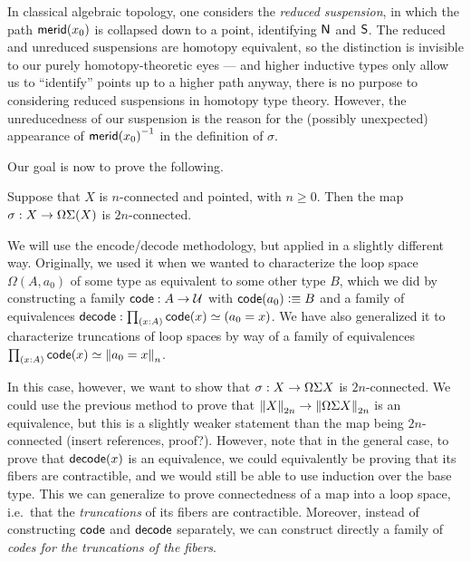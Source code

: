 \begin{rmk}
  In classical algebraic topology, one considers the \emph{reduced suspension}, in which the path $\merid(x_0)$ is collapsed down to a point, identifying $\north$ and $\south$.
  The reduced and unreduced suspensions are homotopy equivalent, so the distinction is invisible to our purely homotopy-theoretic eyes --- and higher inductive types only allow us to ``identify'' points up to a higher path anyway, there is no purpose to considering reduced suspensions in homotopy type theory.
  However, the unreducedness of our suspension is the reason for the (possibly unexpected) appearance of $\opp{\merid(x_0)}$ in the definition of $\sigma$.
\end{rmk}

Our goal is now to prove the following.

\begin{thm}\label{thm:freudenthal}
  Suppose that $X$ is $n$-connected and pointed, with $n\geq 0$.
  Then the map $\sigma:X\to \Omega\susp(X)$ is $2n$-connected.
\end{thm}

We will use the encode/decode methodology, but applied in a slightly different way.
Originally, we used it when we wanted to characterize the loop space $\Omega (A,a_0)$ of some type as equivalent to some other type $B$, which we did by constructing a family $\code:A\to \type$ with $\code(a_0)\defeq B$ and a family of equivalences $\decode:\prd{x:A}\code(x) \simeq (a_0=x)$.
We have also generalized it to characterize truncations of loop spaces by way of a family of equivalences $\prd{x:A}\code(x) \simeq \trunc n{a_0=x}$.

In this case, however, we want to show that $\sigma:X\to \Omega \susp X$ is $2n$-connected.
We could use the previous method to prove that $\trunc{2n}X\to \trunc{2n}{\Omega \susp X}$ is an equivalence, but this is a slightly weaker statement than the map being $2n$-connected (insert references, proof?).
However, note that in the general case, to prove that $\decode(x)$ is an equivalence, we could equivalently be proving that its fibers are contractible, and we would still be able to use induction over the base type.
This we can generalize to prove connectedness of a map into a loop space, i.e.\ that the \emph{truncations} of its fibers are contractible.
Moreover, instead of constructing $\code$ and $\decode$ separately, we can construct directly a family of \emph{codes for the truncations of the fibers}.

